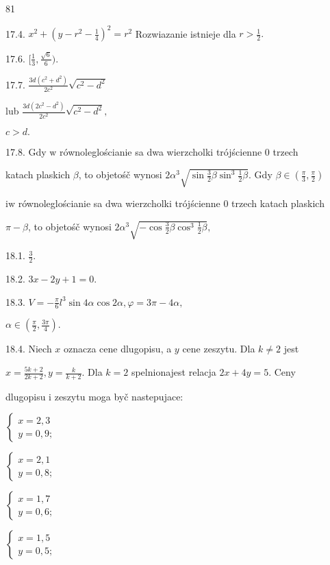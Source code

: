 \documentclass[a4paper,12pt]{article}
\begin{document}
81

17.4. $x^{2}+(y-r^{2}-\displaystyle \frac{1}{4})^{2}=r^{2}$ Rozwiazanie istnieje dla $r>\displaystyle \frac{1}{2}.$

17.6. $[\displaystyle \frac{1}{3},\frac{\sqrt{6}}{6}).$

17.7. $\displaystyle \frac{3d(c^{2}+d^{2})}{2c^{2}}\sqrt{c^{2}-d^{2}}$

lub $\displaystyle \frac{3d(2c^{2}-d^{2})}{2c^{2}}\sqrt{c^{2}-d^{2}},$

$c>d.$

17.8. Gdy $\mathrm{w}$ równoleglościanie sa dwa wierzcholki trójścienne $0$ trzech

katach plaskich $\beta$, to objetośč wynosi $2\alpha^{3}\sqrt{\sin\frac{3}{2}\beta\sin^{3}\frac{1}{2}\beta}$. Gdy $\beta\in (\displaystyle \frac{\pi}{3},\frac{\pi}{2})$

$\mathrm{i}\mathrm{w}$ równoleglościanie sa dwa wierzcholki trójścienne $0$ trzech katach plaskich

$\pi-\beta$, to objetośč wynosi $2\alpha^{3}\sqrt{-\cos\frac{3}{2}\beta\cos^{3}\frac{1}{2}\beta},$

18.1. $\displaystyle \frac{3}{2}.$

18.2. $3x-2y+1=0.$

18.3. $V=-\displaystyle \frac{\pi}{6}l^{3}\sin 4\alpha\cos 2\alpha, \varphi=3\pi-4\alpha,$

$\alpha\in (\displaystyle \frac{\pi}{2},\frac{3\pi}{4}).$

18.4. Niech $x$ oznacza cene dlugopisu, a $y$ cene zeszytu. Dla $k\neq 2$ jest

$x=\displaystyle \frac{5k+2}{2k+2}, y=\displaystyle \frac{k}{k+2}$. Dla $k=2$ spelnionajest relacja $2x+4y=5$. Ceny

dlugopisu $\mathrm{i}$ zeszytu moga byč nastepujace:

$\left\{\begin{array}{l}
x=2,3\\
y=0,9;
\end{array}\right.$

$\left\{\begin{array}{l}
x=2,1\\
y=0,8;
\end{array}\right.$

$\left\{\begin{array}{l}
x=1,7\\
y=0,6;
\end{array}\right.$

$\left\{\begin{array}{l}
x=1,5\\
y=0,5;
\end{array}\right.$
\end{document}
